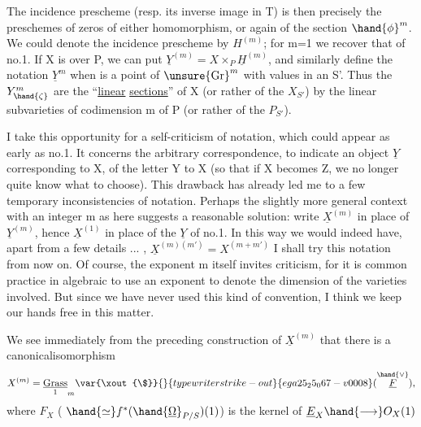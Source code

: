 
The incidence prescheme (resp. its inverse image in T) is then
precisely the preschemes of zeros of either homomorphism,
or again of the section $\hand{\phi}^{m}$. We could denote the incidence
prescheme by $H^{(m)}$; for m=1 we recover that of no.1. If X is
over P, we can put $\underline{Y}^{(m)} = X\times_{P} \underline{H}^{(m)}$, and similarly define
the notation $\underline{Y}^{m}$ when \hand{$\zeta$} is a point of $\unsure{\mathrm{Gr}}^{m}$ with values in an S'.
Thus the  $Y^{m}_{\hand{\zeta}}$ are the “\uline{linear} \uline{sections}” of X  (or rather of
the $X_{S'}$) by the linear subvarieties of codimension m of P (or
rather of the $P_{S'}$).

I take this opportunity for a self-criticism of notation,
which could appear as early as no.1. It concerns the arbitrary correspondence,
to indicate an object $\underline{Y}$ corresponding to X, of the letter
Y to X (so that if X becomes Z, we no longer quite know what
to choose). This drawback has already led me to a few temporary inconsistencies
of notation. Perhaps the slightly more general context
with an integer m as here suggests a reasonable solution: write
$\underline{X}^{(m)}$ in place of $\underline{Y}^{(m)}$, hence $\underline{X}^{(1)}$ in place of the $\underline{Y}$ of no.1. In this
way we would indeed have, apart from a few details ... , $\underline{X}^{(m)(m')} = X^{(m+m')}$
I shall try this notation from now on. Of course, the exponent m
itself invites criticism, for it is common practice in algebraic 
to use an exponent to denote the dimension of the varieties
involved. But since we have never used this kind
of convention, I think we keep our hands free in this matter.

We see immediately from the preceding construction of $\underline{X}^{(m)}$ that
there is a canonicalisomorphism
\[ X^{(m)} = \underset{1}{\underline{\mathrm{Grass}}}_{m}\var{\xout{\$}}{}{typewriter strike-out}{ega25_25_067-v0008}(\overset{\hand{\vee}}{\underline{F}}) , \]
where $F_{X}$ ( $\hand{\simeq} f^{*}(\hand{\underline{\Omega}}_{P/S})(1)$) is the kernel of $\underline{E}_{X} \hand{\longrightarrow} O_{X}(1)$\hand{,}

